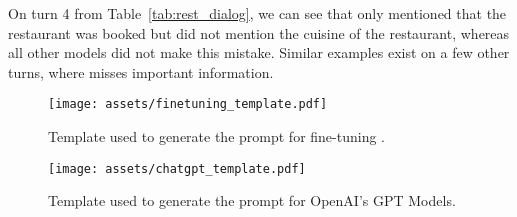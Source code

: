 On turn 4 from Table~\ref{tab:rest_dialog}, we can see that {\gpt} only mentioned that the restaurant was booked but did not mention the cuisine of the restaurant, whereas all other models did not make this mistake. Similar examples exist on a few other turns, where {\gpt} misses important information.

\begin{figure*}
   \centering
   \texttt{[image: assets/finetuning\_template.pdf]}
   
   \caption{
       Template used to generate the prompt for fine-tuning {\oursys}.
   }
   
   \label{fig:finetuning_template}
\end{figure*}

\begin{figure*}
   \centering
   \texttt{[image: assets/chatgpt\_template.pdf]}
   \caption{
       Template used to generate the prompt for OpenAI's GPT Models. 
   }
   
   \label{fig:chatgpt_template}
\end{figure*}


